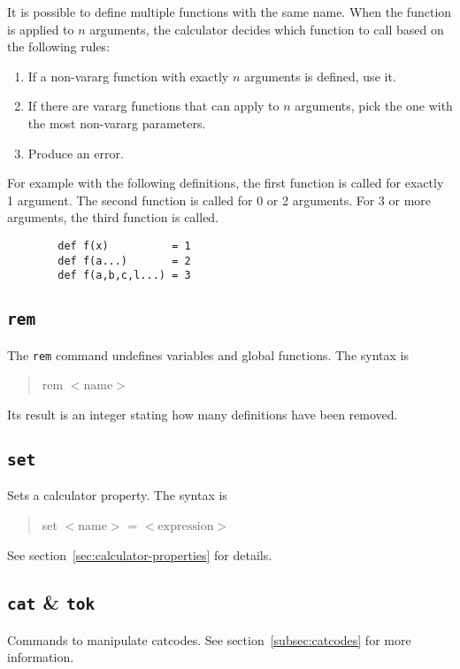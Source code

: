 \documentclass[10pt]{article}
\newcommand{\argument}[1]{{${\big<}\mathrm{#1}{\big>}$}}
\newenvironment{code}{\begin{quote}\ttfamily}{\end{quote}}
\begin{document}
    It is possible to define multiple functions with the same name.
    When the function is applied to $ n $ arguments, the calculator decides which function to call based on the following rules:
    \begingroup
    \setlength{\parskip}{0pt}
    \begin{enumerate}
        \item If a non-vararg function with exactly $ n $ arguments is defined, use it.
        \item If there are vararg functions that can apply to $ n $ arguments, pick the one with the most non-vararg parameters.
        \item Produce an error.
    \end{enumerate}
    \endgroup
    For example with the following definitions, the first function is called for exactly 1 argument.
    The second function is called for 0 or 2 arguments.
    For 3 or more arguments, the third function is called.
    \begin{verbatim}
        def f(x)          = 1
        def f(a...)       = 2
        def f(a,b,c,l...) = 3
    \end{verbatim}
    
    \subsection{\texttt{rem}}\label{subsec:cmd-rem}
    The \verb|rem| command undefines variables and global functions.
    The syntax is
    \begin{code}
        rem \argument{name}
    \end{code}
    Its result is an integer stating how many definitions have been removed.
    
    \subsection{\texttt{set}}\label{subsec:cmd-set}
    Sets a calculator property.
    The syntax is
    \begin{code}
        set \argument{name} = \argument{expression}
    \end{code}
    See section~\ref{sec:calculator-properties} for details.
    
    \subsection{\texttt{cat} \& \texttt{tok}}\label{subsec:cmd-cat-tok}
    Commands to manipulate catcodes.
    See section~\ref{subsec:catcodes} for more information.
    
\end{document}
